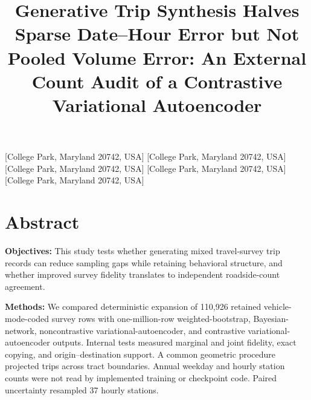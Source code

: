 \documentclass[numbered]{trbunofficial}
\begin{document}
\title{Generative Trip Synthesis Halves Sparse Date--Hour Error but Not Pooled Volume Error: An External Count Audit of a Contrastive Variational Autoencoder}

[College Park, Maryland 20742, USA]
[College Park, Maryland 20742, USA]
[College Park, Maryland 20742, USA]
[College Park, Maryland 20742, USA]
[College Park, Maryland 20742, USA]
\AuthorHeaders{}
\maketitle

\section{Abstract}
\noindent\textbf{Objectives:} This study tests whether generating mixed travel-survey trip records can reduce sampling gaps while retaining behavioral structure, and whether improved survey fidelity translates to independent roadside-count agreement.

\noindent\textbf{Methods:} We compared deterministic expansion of 110,926 retained vehicle-mode-coded survey rows with one-million-row weighted-bootstrap, Bayesian-network, noncontrastive variational-autoencoder, and contrastive variational-autoencoder outputs. Internal tests measured marginal and joint fidelity, exact copying, and origin--destination support. A common geometric procedure projected trips across tract boundaries. Annual weekday and hourly station counts were not read by implemented training or checkpoint code. Paired uncertainty resampled 37 hourly stations.
\end{document}
